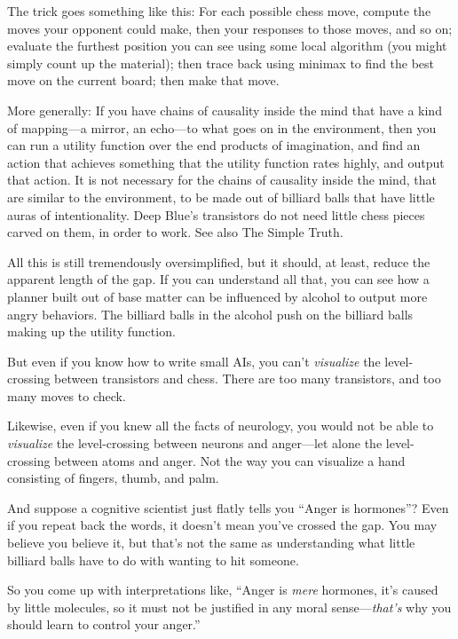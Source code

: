 {
 The trick goes something like this: For each possible chess move,
compute the moves your opponent could make, then your responses to
those moves, and so on; evaluate the furthest position you can see
using some local algorithm (you might simply count up the material);
then trace back using minimax to find the best move on the current
board; then make that move.}

{
 More generally: If you have chains of causality inside the mind
that have a kind of mapping---a mirror, an echo---to what goes on in
the environment, then you can run a utility function over the end
products of imagination, and find an action that achieves something
that the utility function rates highly, and output that action. It is
not necessary for the chains of causality inside the mind, that are
similar to the environment, to be made out of billiard balls that have
little auras of intentionality. Deep Blue's transistors
do not need little chess pieces carved on them, in order to work. See
also The Simple Truth.}

{
 All this is still tremendously oversimplified, but it should, at
least, reduce the apparent length of the gap. If you can understand all
that, you can see how a planner built out of base matter can be
influenced by alcohol to output more angry behaviors. The billiard
balls in the alcohol push on the billiard balls making up the utility
function.}

{
 But even if you know how to write small AIs, you
can't \textit{visualize} the level-crossing between
transistors and chess. There are too many transistors, and too many
moves to check.}

{
 Likewise, even if you knew all the facts of neurology, you would
not be able to \textit{visualize} the level-crossing between neurons
and anger---let alone the level-crossing between atoms and anger. Not
the way you can visualize a hand consisting of fingers, thumb, and
palm.}

{
 And suppose a cognitive scientist just flatly tells you
``Anger is hormones''? Even if you
repeat back the words, it doesn't mean
you've crossed the gap. You may believe you believe it,
but that's not the same as understanding what little
billiard balls have to do with wanting to hit someone.}

{
 So you come up with interpretations like, ``Anger
is \textit{mere} hormones, it's caused by little
molecules, so it must not be justified in any moral
sense---\textit{that's} why you should learn to control
your anger.''}

